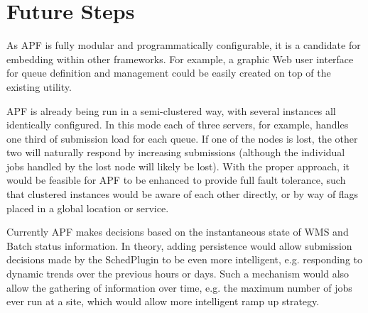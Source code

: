 \documentclass[a4paper]{jpconf}
\begin{document}
\section{Future Steps}

As APF is fully modular and programmatically configurable, it is a candidate for
embedding within other frameworks. For example, a graphic Web user interface for
queue definition and management could be easily created on top of the existing
utility. 

APF is already being run in a semi-clustered way, with several instances all
identically configured. In this mode each of three servers, for example, handles
one third of submission load for each queue. If one of the nodes is lost, the
other two will naturally respond by increasing submissions (although the
individual jobs handled by the lost node will likely be lost). With the proper
approach, it would be feasible for APF to be enhanced to provide full fault
tolerance, such that clustered instances would be aware of each other directly,
or by way of flags placed in a global location or service. 

Currently APF makes decisions based on the instantaneous state of WMS and Batch
status information. In theory, adding persistence would allow submission
decisions made by the SchedPlugin to be even more intelligent, e.g. responding
to dynamic trends over the previous hours or days. Such a mechanism would also
allow the gathering of information over time, e.g. the maximum number of jobs
ever run at a site, which would allow more intelligent ramp up strategy. 



\end{document}
